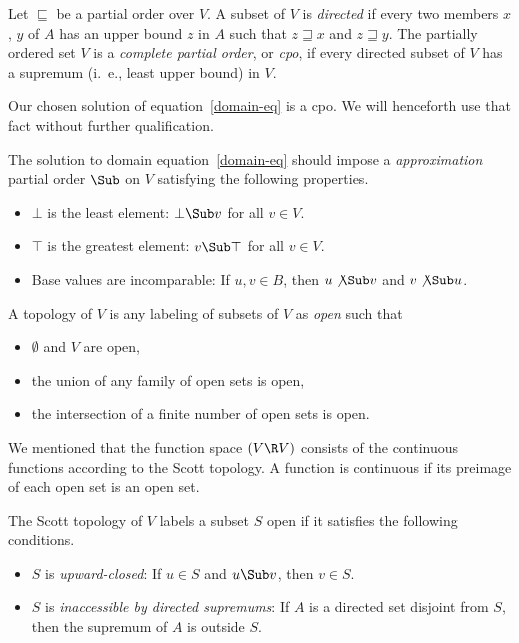 \documentclass{amsart}
\begin{document}

Let $\sqsubseteq$ be a partial order over $V$. A subset of $V$ is
\emph{directed} if every two members $x$, $y$ of $A$ has an upper
bound $z$ in $A$ such that $z\sqsupseteq x$ and $z\sqsupseteq y$.
The partially ordered set $V$ is a \emph{complete partial order},
or \emph{cpo}, if every directed subset of $V$ has a supremum
(i.~e., least upper bound) in $V$.

Our chosen solution of equation~\eqref{domain-eq} is a cpo. We
will henceforth use that fact without further qualification.


The solution to domain equation~\eqref{domain-eq} should impose a
\emph{approximation} partial order $\Sub$ on $V$ satisfying the
following properties.
\begin{itemize}
\item $\bot$ is the least element: $\bot\Sub v$ for all $v\in V$.
\item $\top$ is the greatest element: $v\Sub\top$ for all $v\in
V$.
\item Base values are incomparable: If $u,v\in B$, then
$u\not\Sub v$ and $v\not\Sub u$.
\end{itemize}
A topology of $V$ is any labeling of subsets of $V$ as
\emph{open} such that
\begin{itemize}
\item $\emptyset$ and $V$ are open,
\item the union of any family of open sets is open,
\item the intersection of a finite number of open sets is open.
\end{itemize}
We mentioned that the function space $(V\R V)$ consists of the
continuous functions according to the Scott topology. A function
is continuous if its preimage of each open set is an open set.

\begin{samepage}
The Scott topology of $V$ labels a subset $S$ open if it
satisfies the following conditions.
\begin{itemize}
\item $S$ is \emph{upward-closed}: If $u\in S$ and $u\Sub v$,
then $v\in S$.
\item $S$ is \emph{inaccessible by directed supremums}: If $A$ is
a directed set disjoint from $S$, then the supremum of $A$ is
outside $S$.
\end{itemize}
\end{samepage}
\end{document}
